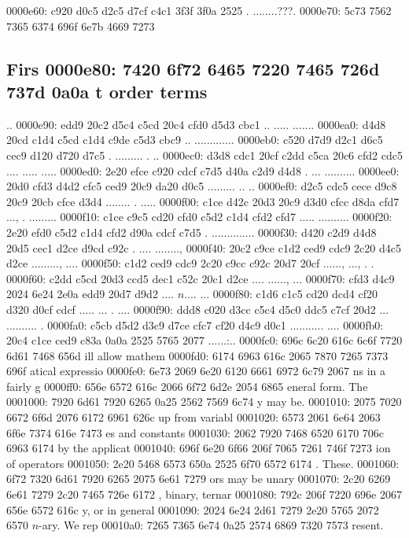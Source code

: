 0000e60: c920 d0c5 d2c5 d7cf c4c1 3f3f 3f0a 2525  . ........???.%
0000e70: 5c73 7562 7365 6374 696f 6e7b 4669 7273  \subsection{Firs
0000e80: 7420 6f72 6465 7220 7465 726d 737d 0a0a  t order terms}..
0000e90: edd9 20c2 d5c4 c5cd 20c4 cfd0 d5d3 cbc1  .. ..... .......
0000ea0: d4d8 20cd c1d4 c5cd c1d4 c9de c5d3 cbc9  .. .............
0000eb0: c520 d7d9 d2c1 d6c5 cec9 d120 d720 d7c5  . ......... . ..
0000ec0: d3d8 cdc1 20cf c2dd c5ca 20c6 cfd2 cdc5  .... ..... .....
0000ed0: 2e20 efce c920 cdcf c7d5 d40a c2d9 d4d8  . ... ..........
0000ee0: 20d0 cfd3 d4d2 cfc5 ced9 20c9 da20 d0c5   ......... .. ..
0000ef0: d2c5 cdc5 cece d9c8 20c9 20cb cfce d3d4  ........ . .....
0000f00: c1ce d42c 20d3 20c9 d3d0 cfcc d8da cfd7  ..., . .........
0000f10: c1ce c9c5 cd20 cfd0 c5d2 c1d4 cfd2 cfd7  ..... ..........
0000f20: 2e20 efd0 c5d2 c1d4 cfd2 d90a cdcf c7d5  . ..............
0000f30: d420 c2d9 d4d8 20d5 cec1 d2ce d9cd c92c  . .... ........,
0000f40: 20c2 c9ce c1d2 ced9 cdc9 2c20 d4c5 d2ce   ........., ....
0000f50: c1d2 ced9 cdc9 2c20 c9cc c92c 20d7 20cf  ......, ..., . .
0000f60: c2dd c5cd 20d3 ccd5 dec1 c52c 20c1 d2ce  .... ......, ...
0000f70: cfd3 d4c9 2024 6e24 2e0a edd9 20d7 d9d2  .... $n$.... ...
0000f80: c1d6 c1c5 cd20 dcd4 cf20 d320 d0cf cdcf  ..... ... . ....
0000f90: ddd8 c020 d3cc c5c4 d5c0 ddc5 c7cf 20d2  ... .......... .
0000fa0: c5cb d5d2 d3c9 d7ce cfc7 cf20 d4c9 d0c1  ........... ....
0000fb0: 20c4 c1ce ced9 c83a 0a0a 2525 5765 2077   ......:..%
0000fc0: 696c 6c20 616c 6c6f 7720 6d61 7468 656d  ill allow mathem
0000fd0: 6174 6963 616c 2065 7870 7265 7373 696f  atical expressio
0000fe0: 6e73 2069 6e20 6120 6661 6972 6c79 2067  ns in a fairly g
0000ff0: 656e 6572 616c 2066 6f72 6d2e 2054 6865  eneral form. The
0001000: 7920 6d61 7920 6265 0a25 2562 7569 6c74  y may be.%
0001010: 2075 7020 6672 6f6d 2076 6172 6961 626c   up from variabl
0001020: 6573 2061 6e64 2063 6f6e 7374 616e 7473  es and constants
0001030: 2062 7920 7468 6520 6170 706c 6963 6174   by the applicat
0001040: 696f 6e20 6f66 206f 7065 7261 746f 7273  ion of operators
0001050: 2e20 5468 6573 650a 2525 6f70 6572 6174  . These.%
0001060: 6f72 7320 6d61 7920 6265 2075 6e61 7279  ors may be unary
0001070: 2c20 6269 6e61 7279 2c20 7465 726e 6172  , binary, ternar
0001080: 792c 206f 7220 696e 2067 656e 6572 616c  y, or in general
0001090: 2024 6e24 2d61 7279 2e20 5765 2072 6570   $n$-ary. We rep
00010a0: 7265 7365 6e74 0a25 2574 6869 7320 7573  resent.%
